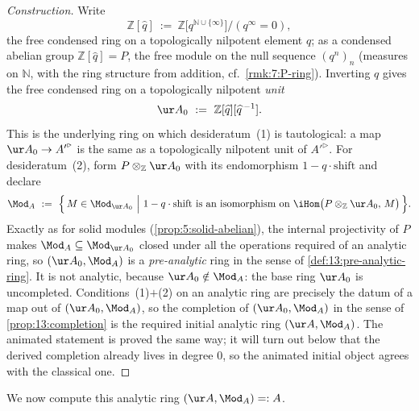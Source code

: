 \begin{proof}[Construction]
Write
\begin{equation*}
\mathbb{Z}[\widehat{q}]\ :=\ \mathbb{Z}\bigl[q^{\mathbb{N}\cup\{\infty\}}\bigr]\big/(q^{\infty}=0),
\end{equation*}
the free condensed ring on a topologically nilpotent element $q$; as a condensed
abelian group $\mathbb{Z}[\widehat{q}]=P$, the free module on the null sequence
$(q^n)_n$ (measures on $\mathbb{N}$, with the ring structure from addition, cf.\
\cref{rmk:7:P-ring}). Inverting $q$ gives the free condensed ring on a topologically
nilpotent \emph{unit}
\begin{equation*}
\ur A_0\ :=\ \mathbb{Z}[\widehat{q}][\widehat{q}^{\,-1}].
\end{equation*}
This is the underlying ring on which desideratum~(1) is tautological: a map
$\ur A_0\to{A'}^{\triangleright}$ is the same as a topologically nilpotent unit of ${A'}^{\triangleright}$. For
desideratum~(2), form $P\otimes_{\mathbb{Z}}\ur A_0$ with its endomorphism
$1-q\cdot\mathrm{shift}$ and declare
\begin{equation}
\label{eq:14:preanalytic-modules}
\Mod_A\ :=\ \Bigl\{\,M\in\Mod_{\ur A_0}\ \Big|\ 1-q\cdot\mathrm{shift}\ \text{is an isomorphism on}\ \iHom\bigl(P\otimes_{\mathbb{Z}}\ur A_0,\,M\bigr)\,\Bigr\}.
\end{equation}
Exactly as for solid modules (\cref{prop:5:solid-abelian}), the internal
projectivity of $P$ makes $\Mod_A\subseteq\Mod_{\ur A_0}$ closed under all the
operations required of an analytic ring, so $(\ur A_0,\Mod_A)$ is a
\emph{pre-analytic} ring in the sense of \cref{def:13:pre-analytic-ring}. It is not
analytic, because $\ur A_0\notin\Mod_A$: the base ring $\ur A_0$ is uncompleted.
Conditions~(1)$+$(2) on an analytic ring are precisely the datum of a map out of
$(\ur A_0,\Mod_A)$, so the completion of $(\ur A_0,\Mod_A)$ in the sense of
\cref{prop:13:completion} is the required initial analytic ring
$(\ur A,\Mod_A)$. The animated statement is proved the same way; it will turn out
below that the derived completion already lives in degree $0$, so the animated
initial object agrees with the classical one.
\end{proof}

We now compute this analytic ring $(\ur A,\Mod_A)=:A$.

